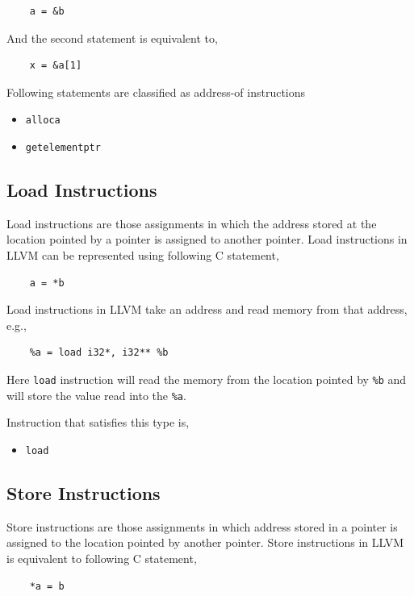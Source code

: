 \documentclass[a4paper,12pt]{report}
\begin{document}
\begin{lstlisting}
    a = &b
\end{lstlisting}

\noindent
And the second statement is equivalent to,
\begin{lstlisting}
    x = &a[1]
\end{lstlisting}

\noindent
Following statements are classified as address-of instructions
\begin{itemize}
    \item \texttt{alloca}
    \item \texttt{getelementptr}
\end{itemize}

\subsection{Load Instructions}
Load instructions are those assignments in which the address stored at the 
location pointed by a pointer is assigned to another pointer.
Load instructions in LLVM can be represented using following C statement,
\begin{lstlisting}
    a = *b
\end{lstlisting}

\noindent
Load instructions in LLVM take an address and read memory from that address,
e.g.,

\begin{verbatim}
    %a = load i32*, i32** %b
\end{verbatim}

\noindent
Here \texttt{load} instruction will read the memory from the location pointed 
by \texttt{\%b} and will store the value read into the \texttt{\%a}.

\noindent
Instruction that satisfies this type is,
\begin{itemize}
 \item \texttt{load}
\end{itemize}


\subsection{Store Instructions}
Store instructions are those assignments in which address stored in a pointer 
is assigned to the location pointed by another pointer.
Store instructions in LLVM is equivalent to following C statement,
\begin{lstlisting}
    *a = b
\end{lstlisting}
\end{document}
